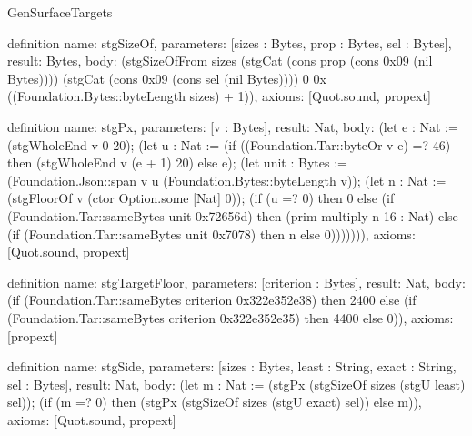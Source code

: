 \begin{lexlean}{GenSurfaceTargets}
\begin{semanticmodule}
definition{
  name: stgSizeOf,
  parameters: [sizes : Bytes, prop : Bytes, sel : Bytes],
  result: Bytes,
  body: (stgSizeOfFrom sizes (stgCat (cons prop (cons 0x09 (nil Bytes)))) (stgCat (cons 0x09 (cons sel (nil Bytes)))) 0 0x ((Foundation.Bytes::byteLength sizes) + 1)),
  axioms: [Quot.sound, propext]
}

definition{
  name: stgPx,
  parameters: [v : Bytes],
  result: Nat,
  body: (let e : Nat := (stgWholeEnd v 0 20); (let u : Nat := (if ((Foundation.Tar::byteOr v e) =? 46) then (stgWholeEnd v (e + 1) 20) else e); (let unit : Bytes := (Foundation.Json::span v u (Foundation.Bytes::byteLength v)); (let n : Nat := (stgFloorOf v (ctor Option.some [Nat] 0)); (if (u =? 0) then 0 else (if (Foundation.Tar::sameBytes unit 0x72656d) then (prim multiply n 16 : Nat) else (if (Foundation.Tar::sameBytes unit 0x7078) then n else 0))))))),
  axioms: [Quot.sound, propext]
}

definition{
  name: stgTargetFloor,
  parameters: [criterion : Bytes],
  result: Nat,
  body: (if (Foundation.Tar::sameBytes criterion 0x322e352e38) then 2400 else (if (Foundation.Tar::sameBytes criterion 0x322e352e35) then 4400 else 0)),
  axioms: [propext]
}

definition{
  name: stgSide,
  parameters: [sizes : Bytes, least : String, exact : String, sel : Bytes],
  result: Nat,
  body: (let m : Nat := (stgPx (stgSizeOf sizes (stgU least) sel)); (if (m =? 0) then (stgPx (stgSizeOf sizes (stgU exact) sel)) else m)),
  axioms: [Quot.sound, propext]
}


\end{semanticmodule}
\end{lexlean}
